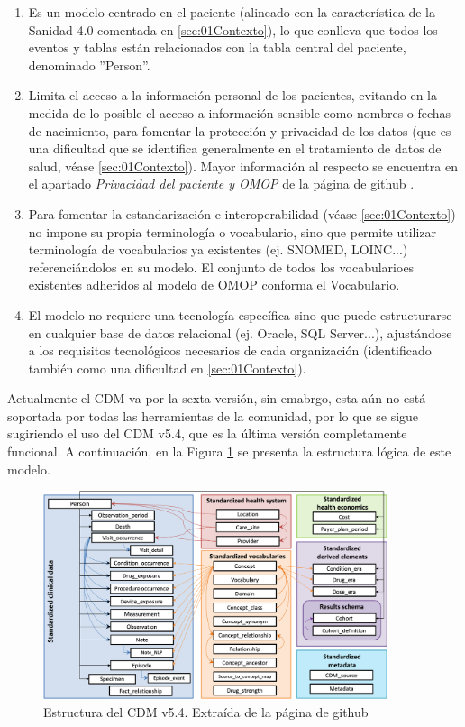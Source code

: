 \begin{enumerate}[label=\alph*.]
    \item Es un modelo centrado en el paciente (alineado con la característica de la Sanidad 4.0 comentada en \ref{sec:01Contexto}), lo que conlleva que todos los eventos y tablas están relacionados con la tabla central del paciente, denominado ''Person''.
    \item Limita el acceso a la información personal de los pacientes, evitando en la medida de lo posible el acceso a información sensible como nombres o fechas de nacimiento, para fomentar la protección y privacidad de los datos (que es una dificultad que se identifica generalmente en el tratamiento de datos de salud, véase \ref{sec:01Contexto}). Mayor información al respecto se encuentra en el apartado \textit{Privacidad del paciente y OMOP} de la página de github \cite{gitPagesCMD}.
    \item Para fomentar la estandarización e interoperabilidad (véase \ref{sec:01Contexto}) no impone su propia terminología o vocabulario, sino que permite utilizar terminología de vocabularios ya existentes (ej. SNOMED, LOINC...) referenciándolos en su modelo. El conjunto de todos los vocabularioes existentes adheridos al modelo de OMOP conforma el Vocabulario.
    \item El modelo no requiere una tecnología específica sino que puede estructurarse en cualquier base de datos relacional (ej. Oracle, SQL Server...), ajustándose a los requisitos tecnológicos necesarios de cada organización (identificado también como una dificultad en \ref{sec:01Contexto}).
    
\end{enumerate}

Actualmente el CDM va por la sexta versión, sin emabrgo, esta aún no está soportada por todas las herramientas de la comunidad, por lo que se sigue sugiriendo el uso del CDM v5.4, que es la última versión completamente funcional. A continuación, en la Figura \ref{fig:cdm54} se presenta la estructura lógica de este modelo.

\begin{figure}[H]
    \centering
    \includegraphics[width=0.90\textwidth]{figures/cdm54.png}
     \caption{Estructura del CDM v5.4. Extraída de la página de github \cite{gitPagesCMD}}
    \label{fig:cdm54}
\end{figure}

